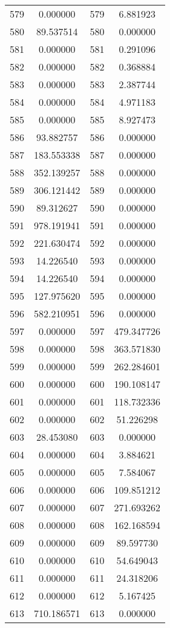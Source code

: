 \documentclass[12pt]{article}
\begin{document}
\begin{longtable}{@{}cccc@{}}
579 & 0.000000 & 579 & 6.881923 \\
580 & 89.537514 & 580 & 0.000000 \\
581 & 0.000000 & 581 & 0.291096 \\
582 & 0.000000 & 582 & 0.368884 \\
583 & 0.000000 & 583 & 2.387744 \\
584 & 0.000000 & 584 & 4.971183 \\
585 & 0.000000 & 585 & 8.927473 \\
586 & 93.882757 & 586 & 0.000000 \\
587 & 183.553338 & 587 & 0.000000 \\
588 & 352.139257 & 588 & 0.000000 \\
589 & 306.121442 & 589 & 0.000000 \\
590 & 89.312627 & 590 & 0.000000 \\
591 & 978.191941 & 591 & 0.000000 \\
592 & 221.630474 & 592 & 0.000000 \\
593 & 14.226540 & 593 & 0.000000 \\
594 & 14.226540 & 594 & 0.000000 \\
595 & 127.975620 & 595 & 0.000000 \\
596 & 582.210951 & 596 & 0.000000 \\
597 & 0.000000 & 597 & 479.347726 \\
598 & 0.000000 & 598 & 363.571830 \\
599 & 0.000000 & 599 & 262.284601 \\
600 & 0.000000 & 600 & 190.108147 \\
601 & 0.000000 & 601 & 118.732336 \\
602 & 0.000000 & 602 & 51.226298 \\
603 & 28.453080 & 603 & 0.000000 \\
604 & 0.000000 & 604 & 3.884621 \\
605 & 0.000000 & 605 & 7.584067 \\
606 & 0.000000 & 606 & 109.851212 \\
607 & 0.000000 & 607 & 271.693262 \\
608 & 0.000000 & 608 & 162.168594 \\
609 & 0.000000 & 609 & 89.597730 \\
610 & 0.000000 & 610 & 54.649043 \\
611 & 0.000000 & 611 & 24.318206 \\
612 & 0.000000 & 612 & 5.167425 \\
613 & 710.186571 & 613 & 0.000000 \\

\end{longtable}
\end{document}
